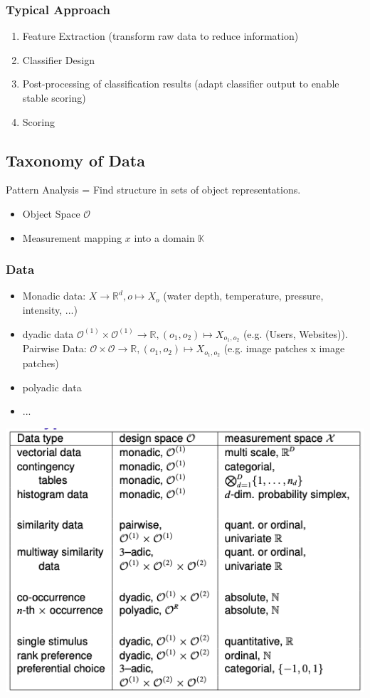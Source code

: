 \subsubsection{Typical Approach}
\begin{enumerate}
	\item Feature Extraction (transform raw data to reduce information)
	\item Classifier Design
	\item Post-processing of classification results (adapt classifier output to enable stable scoring)
	\item Scoring
\end{enumerate}

\subsection{Taxonomy of Data}
Pattern Analysis = Find structure in sets of object representations.

\begin{itemize}
	\item Object Space $\mathcal{O}$
	\item Measurement mapping $x$ into a domain $\mathbb{K}$
\end{itemize}

\subsubsection{Data}
\begin{itemize}
	\item Monadic data: $X \to \mathbb R^d, o\mapsto X_o$ (water depth, temperature, pressure, intensity, ...)
	\item dyadic data $\mathcal O^{(1)} \times \mathcal O^{(1)} \to \mathbb R, (o_1, o_2) \mapsto X_{o_1, o_2}$ (e.g. (Users, Websites)). \\
		Pairwise Data: $\mathcal O \times \mathcal O \to \mathbb R, (o_1, o_2) \mapsto X_{o_1, o_2}$ (e.g. image patches x image patches)
	\item polyadic data
	\item ...
\end{itemize}
\begin{center}
	\includegraphics[width=0.8\columnwidth]{images/2-datatypes}
\end{center}

